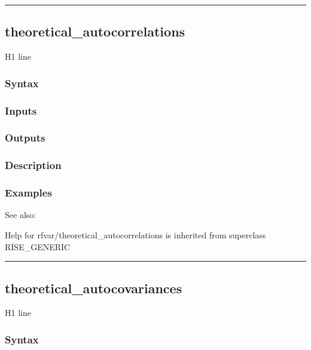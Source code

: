 \documentclass[letterpaper,10pt,english]{sphinxmanual}
\begin{document}
\bigskip\hrule{}\bigskip



\subsection{theoretical\_autocorrelations}
\label{classes/models/@rfvar/rfvar:theoretical-autocorrelations}\label{classes/models/@rfvar/rfvar:id148}
H1 line


\subsubsection{Syntax}
\label{classes/models/@rfvar/rfvar:id149}

\subsubsection{Inputs}
\label{classes/models/@rfvar/rfvar:id150}

\subsubsection{Outputs}
\label{classes/models/@rfvar/rfvar:id151}

\subsubsection{Description}
\label{classes/models/@rfvar/rfvar:id152}

\subsubsection{Examples}
\label{classes/models/@rfvar/rfvar:id153}
See also:

Help for rfvar/theoretical\_autocorrelations is inherited from superclass RISE\_GENERIC


\bigskip\hrule{}\bigskip



\subsection{theoretical\_autocovariances}
\label{classes/models/@rfvar/rfvar:id154}\label{classes/models/@rfvar/rfvar:theoretical-autocovariances}
H1 line


\subsubsection{Syntax}
\label{classes/models/@rfvar/rfvar:id155}
\end{document}
